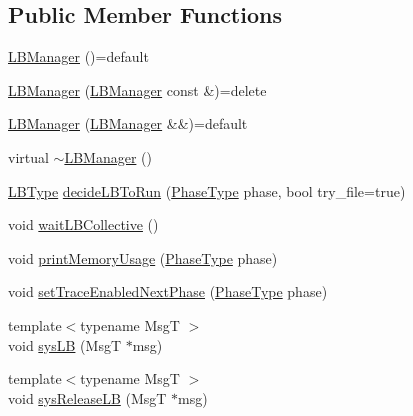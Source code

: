 \subsection*{Public Member Functions}
\begin{DoxyCompactItemize}
\item 
\hyperlink{structvt_1_1vrt_1_1collection_1_1balance_1_1_l_b_manager_a4adad6931af7d5ff2cb983859ed939f3}{L\+B\+Manager} ()=default
\item 
\hyperlink{structvt_1_1vrt_1_1collection_1_1balance_1_1_l_b_manager_af361eb6d3fa35d04873fcbe74b315d4a}{L\+B\+Manager} (\hyperlink{structvt_1_1vrt_1_1collection_1_1balance_1_1_l_b_manager}{L\+B\+Manager} const \&)=delete
\item 
\hyperlink{structvt_1_1vrt_1_1collection_1_1balance_1_1_l_b_manager_ab5efdf949166922f70cb49d171bf509a}{L\+B\+Manager} (\hyperlink{structvt_1_1vrt_1_1collection_1_1balance_1_1_l_b_manager}{L\+B\+Manager} \&\&)=default
\item 
virtual \hyperlink{structvt_1_1vrt_1_1collection_1_1balance_1_1_l_b_manager_a1b2c452667a70cbd1287969c32f538f1}{$\sim$\+L\+B\+Manager} ()
\item 
\hyperlink{namespacevt_1_1vrt_1_1collection_1_1balance_ac4f99693509affcc67db182d4aad9b5c}{L\+B\+Type} \hyperlink{structvt_1_1vrt_1_1collection_1_1balance_1_1_l_b_manager_a6c610e1c053f986932d8a59bb89eb37d}{decide\+L\+B\+To\+Run} (\hyperlink{namespacevt_a46ce6733d5cdbd735d561b7b4029f6d7}{Phase\+Type} phase, bool try\+\_\+file=true)
\item 
void \hyperlink{structvt_1_1vrt_1_1collection_1_1balance_1_1_l_b_manager_a2923d77f512a955194589450cbb85b80}{wait\+L\+B\+Collective} ()
\item 
void \hyperlink{structvt_1_1vrt_1_1collection_1_1balance_1_1_l_b_manager_ab4b84a51a709bf75f64b3158c29eddc8}{print\+Memory\+Usage} (\hyperlink{namespacevt_a46ce6733d5cdbd735d561b7b4029f6d7}{Phase\+Type} phase)
\item 
void \hyperlink{structvt_1_1vrt_1_1collection_1_1balance_1_1_l_b_manager_abb0411627a6282d0c08dd1c6b42046f7}{set\+Trace\+Enabled\+Next\+Phase} (\hyperlink{namespacevt_a46ce6733d5cdbd735d561b7b4029f6d7}{Phase\+Type} phase)
\item 
{\footnotesize template$<$typename MsgT $>$ }\\void \hyperlink{structvt_1_1vrt_1_1collection_1_1balance_1_1_l_b_manager_a5a3a3a1c74201981c2d62b85c2e84006}{sys\+LB} (MsgT $\ast$msg)
\item 
{\footnotesize template$<$typename MsgT $>$ }\\void \hyperlink{structvt_1_1vrt_1_1collection_1_1balance_1_1_l_b_manager_a50a782417c408ce3c33e7d70ebcd5d2e}{sys\+Release\+LB} (MsgT $\ast$msg)

\end{DoxyCompactItemize}
